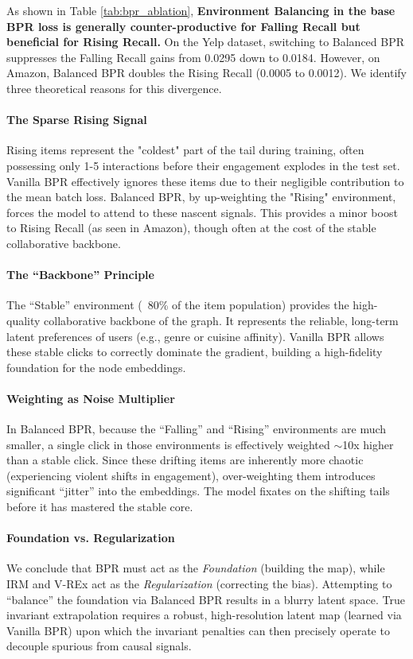 \documentclass{article}
\begin{document}
As shown in Table \ref{tab:bpr_ablation}, \textbf{Environment Balancing in the base BPR loss is generally counter-productive for Falling Recall but beneficial for Rising Recall.} On the Yelp dataset, switching to Balanced BPR suppresses the Falling Recall gains from 0.0295 down to 0.0184. However, on Amazon, Balanced BPR doubles the Rising Recall (0.0005 to 0.0012). We identify three theoretical reasons for this divergence.

\paragraph{The Sparse Rising Signal}
Rising items represent the "coldest" part of the tail during training, often possessing only 1-5 interactions before their engagement explodes in the test set. Vanilla BPR effectively ignores these items due to their negligible contribution to the mean batch loss. Balanced BPR, by up-weighting the "Rising" environment, forces the model to attend to these nascent signals. This provides a minor boost to Rising Recall (as seen in Amazon), though often at the cost of the stable collaborative backbone.

\paragraph{The ``Backbone'' Principle}
The ``Stable'' environment (~80\% of the item population) provides the high-quality collaborative backbone of the graph. It represents the reliable, long-term latent preferences of users (e.g., genre or cuisine affinity). Vanilla BPR allows these stable clicks to correctly dominate the gradient, building a high-fidelity foundation for the node embeddings.

\paragraph{Weighting as Noise Multiplier}
In Balanced BPR, because the ``Falling'' and ``Rising'' environments are much smaller, a single click in those environments is effectively weighted $\sim$10x higher than a stable click. Since these drifting items are inherently more chaotic (experiencing violent shifts in engagement), over-weighting them introduces significant ``jitter'' into the embeddings. The model fixates on the shifting tails before it has mastered the stable core.

\paragraph{Foundation vs. Regularization}
We conclude that BPR must act as the \textit{Foundation} (building the map), while IRM and V-REx act as the \textit{Regularization} (correcting the bias). Attempting to ``balance'' the foundation via Balanced BPR results in a blurry latent space. True invariant extrapolation requires a robust, high-resolution latent map (learned via Vanilla BPR) upon which the invariant penalties can then precisely operate to decouple spurious from causal signals.
\end{document}
